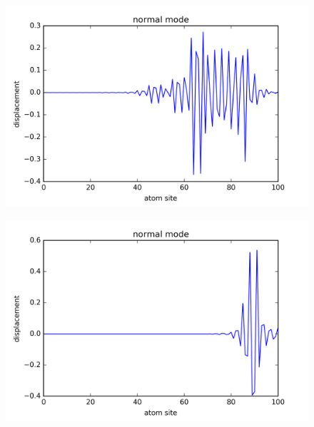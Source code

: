 \begin{figure}[!htbh]
\centering
\begin{minipage}{.45\textwidth}
  \centering
  \includegraphics[width=1.1\linewidth]{Harmonic_spring_ratio/prob_spr_N_103sp_2_0p_0_176th.png}
  \label{fig:prob_spring_N_103m_2p_0_1_76th}
\end{minipage}\qquad
\begin{minipage}{.45\textwidth}
  \centering
  \includegraphics[width=1.1\linewidth]{Harmonic_spring_ratio/prob_spr_N_103sp_2_0p_0_576th.png}
  \label{fig:prob_spring_N_103m_2p_0_5_76th}
\end{minipage}
\end{figure}

